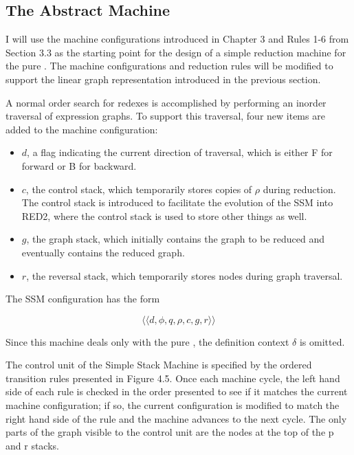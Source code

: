 
\subsection{The Abstract Machine}

I will use the machine configurations introduced in Chapter 3 and Rules 1-6 from Section 3.3 as the starting point for the design of a simple reduction machine for the pure \lambdacalculus{}. The machine configurations and reduction rules will be modified to support the linear graph representation introduced in the previous section.

A normal order search for redexes is accomplished by performing an inorder traversal
of expression graphs. To support this traversal, four new items are added to the
machine configuration:

\begin{itemize}
\item \(d\), a flag indicating the current direction of traversal, which is either
F for forward or B for backward.
\item \(c\), the control stack, which temporarily stores copies of \(\rho\) during
reduction. The control stack is introduced to facilitate the evolution of the SSM
into RED2, where the control stack is used to store other things as well.
\item \(g\), the graph stack, which initially contains the graph to be reduced and
eventually contains the reduced graph.
\item \(r\), the reversal stack, which temporarily stores nodes during graph
traversal.
\end{itemize}

The SSM configuration has the form

\[
\langle\!\langle d,\phi,q,\rho,c,g,r\rangle\!\rangle
\]

Since this machine deals only with the pure \lambdacalculus{}, the definition
context \(\delta\) is omitted.

The control unit of the Simple Stack Machine is specified by the ordered transition rules presented in Figure 4.5. Once each machine cycle, the left hand side of each rule is checked in the order presented to see if it matches the current machine configuration; if so, the current configuration is modified to match the right hand side of the rule and the machine advances to the next cycle. The only parts of the graph visible to the control unit are the nodes at the top of the p and r stacks.

